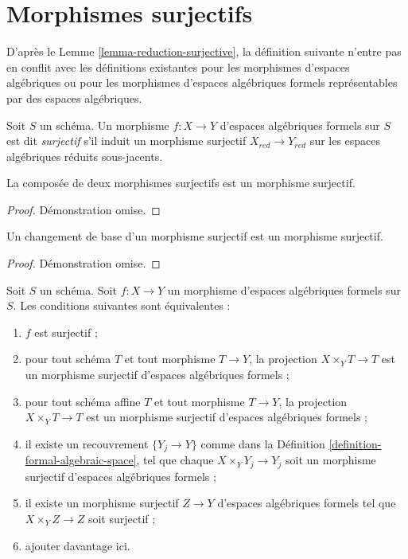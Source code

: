 \section{Morphismes surjectifs}
\label{section-surjective}

\noindent
D'après le Lemme \ref{lemma-reduction-surjective}, la définition suivante n'entre
pas en conflit avec les définitions existantes pour les morphismes d'espaces
algébriques ou pour les morphismes d'espaces algébriques formels représentables
par des espaces algébriques.

\begin{definition}
\label{definition-surjective}
Soit $S$ un schéma. Un morphisme $f : X \to Y$ d'espaces algébriques formels
sur $S$ est dit {\it surjectif} s'il induit un morphisme surjectif
$X_{red} \to Y_{red}$ sur les espaces algébriques réduits sous-jacents.
\end{definition}

\begin{lemma}
\label{lemma-composition-surjective}
La composée de deux morphismes surjectifs est un morphisme surjectif.
\end{lemma}

\begin{proof}
Démonstration omise.
\end{proof}

\begin{lemma}
\label{lemma-base-change-surjective}
Un changement de base d'un morphisme surjectif est un morphisme surjectif.
\end{lemma}

\begin{proof}
Démonstration omise.
\end{proof}

\begin{lemma}
\label{lemma-characterize-surjective}
Soit $S$ un schéma. Soit $f : X \to Y$ un morphisme d'espaces algébriques formels
sur $S$. Les conditions suivantes sont équivalentes :
\begin{enumerate}
\item $f$ est surjectif ;
\item pour tout schéma $T$ et tout morphisme $T \to Y$,
la projection $X \times_Y T \to T$ est un morphisme surjectif
d'espaces algébriques formels ;
\item pour tout schéma affine $T$ et tout morphisme $T \to Y$,
la projection $X \times_Y T \to T$ est un morphisme surjectif d'espaces algébriques
formels ;
\item il existe un recouvrement $\{Y_j \to Y\}$ comme dans la
Définition \ref{definition-formal-algebraic-space},
tel que chaque $X \times_Y Y_j \to Y_j$ soit un morphisme surjectif
d'espaces algébriques formels ;
\item il existe un morphisme surjectif $Z \to Y$
d'espaces algébriques formels tel que $X \times_Y Z \to Z$ soit surjectif ;
\item ajouter davantage ici.
\end{enumerate}
\end{lemma}

